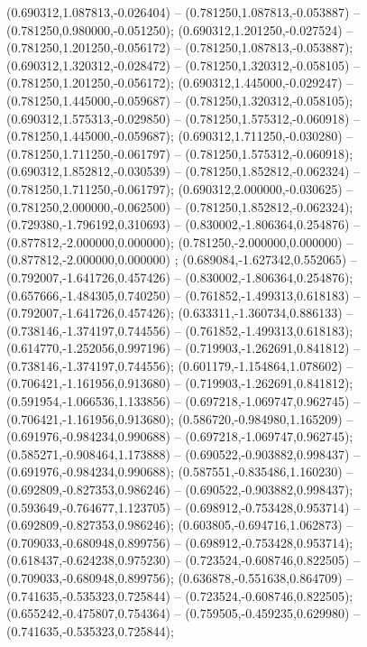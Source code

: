 (0.690312,1.087813,-0.026404) -- (0.781250,1.087813,-0.053887) -- (0.781250,0.980000,-0.051250);
 (0.690312,1.201250,-0.027524) -- (0.781250,1.201250,-0.056172) -- (0.781250,1.087813,-0.053887);
 (0.690312,1.320312,-0.028472) -- (0.781250,1.320312,-0.058105) -- (0.781250,1.201250,-0.056172);
 (0.690312,1.445000,-0.029247) -- (0.781250,1.445000,-0.059687) -- (0.781250,1.320312,-0.058105);
 (0.690312,1.575313,-0.029850) -- (0.781250,1.575312,-0.060918) -- (0.781250,1.445000,-0.059687);
 (0.690312,1.711250,-0.030280) -- (0.781250,1.711250,-0.061797) -- (0.781250,1.575312,-0.060918);
 (0.690312,1.852812,-0.030539) -- (0.781250,1.852812,-0.062324) -- (0.781250,1.711250,-0.061797);
 (0.690312,2.000000,-0.030625) -- (0.781250,2.000000,-0.062500) -- (0.781250,1.852812,-0.062324);
 (0.729380,-1.796192,0.310693) -- (0.830002,-1.806364,0.254876) -- (0.877812,-2.000000,0.000000);
 (0.781250,-2.000000,0.000000) -- (0.877812,-2.000000,0.000000) ;
 (0.689084,-1.627342,0.552065) -- (0.792007,-1.641726,0.457426) -- (0.830002,-1.806364,0.254876);
 (0.657666,-1.484305,0.740250) -- (0.761852,-1.499313,0.618183) -- (0.792007,-1.641726,0.457426);
 (0.633311,-1.360734,0.886133) -- (0.738146,-1.374197,0.744556) -- (0.761852,-1.499313,0.618183);
 (0.614770,-1.252056,0.997196) -- (0.719903,-1.262691,0.841812) -- (0.738146,-1.374197,0.744556);
 (0.601179,-1.154864,1.078602) -- (0.706421,-1.161956,0.913680) -- (0.719903,-1.262691,0.841812);
 (0.591954,-1.066536,1.133856) -- (0.697218,-1.069747,0.962745) -- (0.706421,-1.161956,0.913680);
 (0.586720,-0.984980,1.165209) -- (0.691976,-0.984234,0.990688) -- (0.697218,-1.069747,0.962745);
 (0.585271,-0.908464,1.173888) -- (0.690522,-0.903882,0.998437) -- (0.691976,-0.984234,0.990688);
 (0.587551,-0.835486,1.160230) -- (0.692809,-0.827353,0.986246) -- (0.690522,-0.903882,0.998437);
 (0.593649,-0.764677,1.123705) -- (0.698912,-0.753428,0.953714) -- (0.692809,-0.827353,0.986246);
 (0.603805,-0.694716,1.062873) -- (0.709033,-0.680948,0.899756) -- (0.698912,-0.753428,0.953714);
 (0.618437,-0.624238,0.975230) -- (0.723524,-0.608746,0.822505) -- (0.709033,-0.680948,0.899756);
 (0.636878,-0.551638,0.864709) -- (0.741635,-0.535323,0.725844) -- (0.723524,-0.608746,0.822505);
 (0.655242,-0.475807,0.754364) -- (0.759505,-0.459235,0.629980) -- (0.741635,-0.535323,0.725844);
